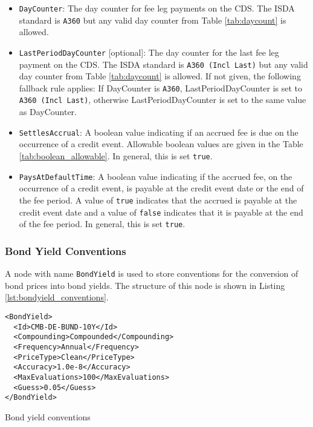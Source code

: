 \begin{itemize}
\item \lstinline!DayCounter!:
The day counter for fee leg payments on the CDS. The ISDA standard is \lstinline!A360! but any valid day counter from Table \ref{tab:daycount} is allowed.

\item \lstinline!LastPeriodDayCounter! [optional]: The day counter for the last fee leg payment on the CDS. The ISDA
  standard is \lstinline!A360 (Incl Last)! but any valid day counter from Table \ref{tab:daycount} is allowed. If not
  given, the following fallback rule applies: If DayCounter is \lstinline!A360!, LastPeriodDayCounter is set to
  \lstinline!A360 (Incl Last)!, otherwise LastPeriodDayCounter is set to the same value as DayCounter.

\item \lstinline!SettlesAccrual!:
A boolean value indicating if an accrued fee is due on the occurrence of a credit event. Allowable boolean values are given in the Table \ref{tab:boolean_allowable}. In general, this is set \lstinline!true!.

\item \lstinline!PaysAtDefaultTime!:
A boolean value indicating if the accrued fee, on the occurrence of a credit event, is payable at the credit event date or the end of the fee period. A value of \lstinline!true! indicates that the accrued is payable at the credit event date and a value of \lstinline!false! indicates that it is payable at the end of the fee period. In general, this is set \lstinline!true!.

\end{itemize}



\subsubsection{Bond Yield Conventions}
A node with name \lstinline!BondYield! is used to store conventions for the conversion
of bond prices into bond yields.
The structure of this node is shown in Listing \ref{lst:bondyield_conventions}.

\begin{listing}[H]
\begin{verbatim}
<BondYield>
  <Id>CMB-DE-BUND-10Y</Id>
  <Compounding>Compounded</Compounding>
  <Frequency>Annual</Frequency>
  <PriceType>Clean</PriceType>
  <Accuracy>1.0e-8</Accuracy>
  <MaxEvaluations>100</MaxEvaluations>
  <Guess>0.05</Guess>
</BondYield>
\end{verbatim}
\caption{Bond yield conventions}
\label{lst:bondyield_conventions}
\end{listing}

